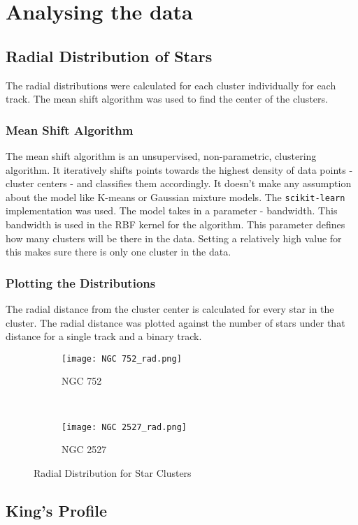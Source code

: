 \chapter{Analysing the data}\label{ch:ch3}

\section{Radial Distribution of Stars}
The radial distributions were calculated for each cluster individually for each track. The mean shift algorithm was used to find the center of the clusters. 

\subsection{Mean Shift Algorithm}
The mean shift algorithm is an unsupervised, non-parametric, clustering algorithm. It iteratively shifts points towards the highest density of data points - cluster centers - and classifies them accordingly. It doesn't make any assumption about the model like K-means or Gaussian mixture models. The \lstinline{scikit-learn}\citep{scikit-learn} implementation was used. The model takes in a parameter - bandwidth. This bandwidth is used in the RBF kernel for the algorithm. This parameter defines how many clusters will be there in the data. Setting a relatively high value for this makes sure there is only one cluster in the data. 

\subsection{Plotting the Distributions}
The radial distance from the cluster center is calculated for every star in the cluster. The radial distance was plotted against the number of stars under that distance for a single track and a binary track. 

\begin{figure}[H]
\centering
\begin{subfigure}[b]{0.45\textwidth}
  \centering
  \texttt{[image: NGC 752\_rad.png]}
  \caption{NGC 752}
  \label{fig:im1}
 \end{subfigure}
~
\begin{subfigure}[b]{0.45\textwidth}
  \centering
  \texttt{[image: NGC 2527\_rad.png]}
  \caption{NGC 2527}
  \label{fig:im2}
\end{subfigure}
\caption{Radial Distribution for Star Clusters}
\label{fig:subfigs cap}
\end{figure}

\section{King's Profile}


